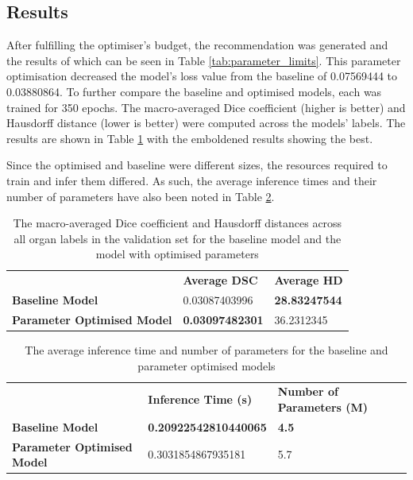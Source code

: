 \documentclass{l4proj}
\begin{document}
\subsection{Results}

After fulfilling the optimiser’s budget, the recommendation was generated and the results of which can be seen in Table \ref{tab:parameter_limits}. This parameter optimisation decreased the model’s loss value from the baseline of \num{0.07569444} to \num{0.03880864}. To further compare the baseline and optimised models, each was trained for 350 epochs. The macro-averaged Dice coefficient (higher is better) and Hausdorff distance (lower is better) were computed across the models' labels. The results are shown in Table \ref{tab:parameter_optimisation_results} with the emboldened results showing the best.

Since the optimised and baseline were different sizes, the resources required to train and infer them differed. As such, the average inference times and their number of parameters have also been noted in Table \ref{tab:parameter_optimisation_other}.

\begin{table}[]
\caption{The macro-averaged Dice coefficient and Hausdorff distances across all organ labels in the validation set for the baseline model and the model with optimised parameters} \label{tab:parameter_optimisation_results}
\begin{tabular}{lll}
\textbf{}                          & \textbf{Average DSC} & \textbf{Average HD} \\
\textbf{Baseline Model}            & \num{0.03087403996}                  & \textbf{\num{28.83247544}}                 \\
\textbf{Parameter Optimised Model} & \textbf{\num{0.03097482301}}                  & \num{36.2312345}                
\end{tabular}
\end{table}

\begin{table}[]
\caption{The average inference time and number of parameters for the baseline and parameter optimised models} \label{tab:parameter_optimisation_other}
\begin{tabular}{lll}
\textbf{}                          & \textbf{Inference Time (s)} & \textbf{Number of Parameters (M)} \\
\textbf{Baseline Model}            & \textbf{\num{0.20922542810440065}}                  & \textbf{4.5}                 \\
\textbf{Parameter Optimised Model} & \num{0.3031854867935181}                  & 5.7
\end{tabular}
\end{table}
\end{document}

